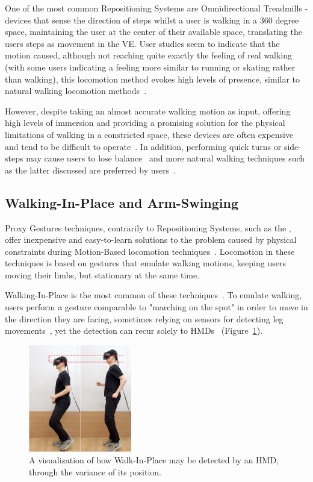 One of the most common Repositioning Systems are Omnidirectional Treadmills - devices that sense the direction of steps whilst a user is
walking in a 360 degree space, maintaining the user at the center of their available space, translating the users steps as movement in the \gls{VE}.
User studies seem to indicate that the motion caused, although not reaching quite exactly the feeling of real walking (with some users indicating a 
feeling more similar to running or skating rather than walking), this locomotion method evokes high levels of presence, similar to natural 
walking locomotion methods~\cite{Syamil2024}.

However, despite taking an almost accurate walking motion as input, offering high levels of immersion and providing a promising solution 
for the physical limitations of walking in a constricted space, these devices are often expensive and tend to be difficult to operate~\cite{Cherni2020}.
In addition, performing quick turns or side-steps may cause users to lose balance~\cite{Nilsson2018} and more natural walking techniques 
such as the latter discussed  are preferred by users~\cite{Syamil2024}. 

\subsection{Walking-In-Place and Arm-Swinging}
\label{sec:wip-and-as}

Proxy Gestures techniques, contrarily to Repositioning Systems, such as the , offer inexpensive 
and easy-to-learn solutions to the problem caused by physical constraints during Motion-Based locomotion techniques~\cite{Nilsson2018}. 
Locomotion in these techniques is based on gestures that emulate walking motions, keeping users moving their limbs, but 
stationary at the same time.

Walking-In-Place is the most common of these techniques~\cite{Boletsis2019,Nilsson2018}. To emulate walking, users perform a 
gesture comparable to "marching on the spot" in order to move in the direction they are facing, sometimes relying on sensors for 
detecting leg movements~\cite{Cherni2020}, yet the detection can recur solely to \glspl{HMD}~\cite{Lee2018} (Figure~\ref{fig:wip}).

\begin{figure}[b]
    \centering
    \includegraphics[width=0.4\textwidth]{NOVAthesisFiles/Images/papers/wip.png}
    \caption[Walk-in-Place Tracking Example]{A visualization of how Walk-In-Place may be detected by an \gls{HMD}, through the variance of its position.~\cite{Lee2018}}
    \label{fig:wip}
\end{figure}

